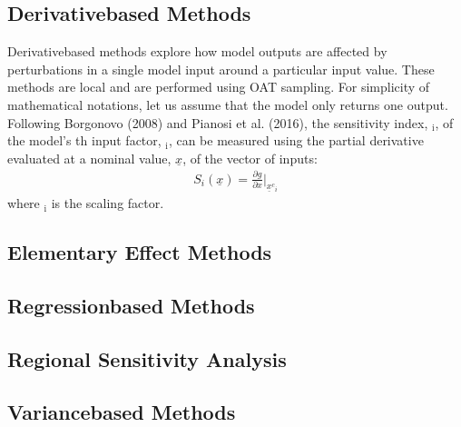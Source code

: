 \documentclass[letterpaper,10pt,english]{sphinxmanual}
\begin{document}
\subsection{Derivative\sphinxhyphen{}based Methods}
\label{\detokenize{3_sensitivity_analysis_the_basics:derivative-based-methods}}
\sphinxAtStartPar
Derivative\sphinxhyphen{}based methods explore how model outputs are affected by perturbations in a single model input around a particular input value. These methods are local and are performed using OAT sampling. For simplicity of mathematical notations, let us assume that the model  only returns one output. Following Borgonovo (2008) and Pianosi et al. (2016), the sensitivity index, $_{\text{i}}$, of the model’s \sphinxhyphen{}th input factor, $_{\text{i}}$, can be measured using the partial derivative evaluated at a nominal value, \(\underline x\), of the vector of inputs:
\begin{equation*}
\begin{split}S_i (\underline x) = \frac{\partial g}{\partial x} |_{\underline x{^c{_i}}}\end{split}
\end{equation*}
\sphinxAtStartPar
where $_{\text{i}}$ is the scaling factor.


\subsection{Elementary Effect Methods}
\label{\detokenize{3_sensitivity_analysis_the_basics:elementary-effect-methods}}

\subsection{Regression\sphinxhyphen{}based Methods}
\label{\detokenize{3_sensitivity_analysis_the_basics:regression-based-methods}}

\subsection{Regional Sensitivity Analysis}
\label{\detokenize{3_sensitivity_analysis_the_basics:regional-sensitivity-analysis}}

\subsection{Variance\sphinxhyphen{}based Methods}
\label{\detokenize{3_sensitivity_analysis_the_basics:variance-based-methods}}
\end{document}

